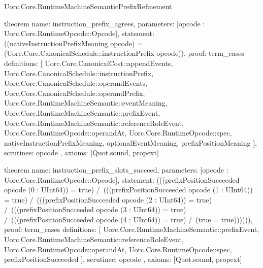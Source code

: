 \begin{lexlean}{Uorc.Core.RuntimeMachineSemanticPrefixRefinement}
\begin{semanticmodule}
theorem{
  name: instruction_prefix_agrees,
  parameters: [opcode : Uorc.Core.RuntimeOpcode::Opcode],
  statement: ((nativeInstructionPrefixMeaning opcode) = (Uorc.Core.CanonicalSchedule::instructionPrefix opcode)),
  proof: term_cases{
    definitions: [
      Uorc.Core.CanonicalCost::appendEvents,
      Uorc.Core.CanonicalSchedule::instructionPrefix,
      Uorc.Core.CanonicalSchedule::operandEvents,
      Uorc.Core.CanonicalSchedule::operandPrefix,
      Uorc.Core.RuntimeMachineSemantic::eventMeaning,
      Uorc.Core.RuntimeMachineSemantic::prefixEvent,
      Uorc.Core.RuntimeMachineSemantic::referenceRoleEvent,
      Uorc.Core.RuntimeOpcode::operandAt,
      Uorc.Core.RuntimeOpcode::spec,
      nativeInstructionPrefixMeaning,
      optionalEventMeaning,
      prefixPositionMeaning
    ],
    scrutinee: opcode
  },
  axioms: [Quot.sound, propext]
}

theorem{
  name: instruction_prefix_slots_succeed,
  parameters: [opcode : Uorc.Core.RuntimeOpcode::Opcode],
  statement: (((prefixPositionSucceeded opcode (0 : UInt64)) = true) /\ (((prefixPositionSucceeded opcode (1 : UInt64)) = true) /\ (((prefixPositionSucceeded opcode (2 : UInt64)) = true) /\ (((prefixPositionSucceeded opcode (3 : UInt64)) = true) /\ (((prefixPositionSucceeded opcode (4 : UInt64)) = true) /\ (true = true)))))),
  proof: term_cases{
    definitions: [
      Uorc.Core.RuntimeMachineSemantic::prefixEvent,
      Uorc.Core.RuntimeMachineSemantic::referenceRoleEvent,
      Uorc.Core.RuntimeOpcode::operandAt,
      Uorc.Core.RuntimeOpcode::spec,
      prefixPositionSucceeded
    ],
    scrutinee: opcode
  },
  axioms: [Quot.sound, propext]
}
\end{semanticmodule}
\end{lexlean}
